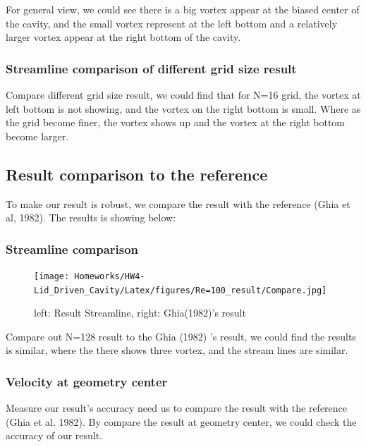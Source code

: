 \documentclass[12pt]{article}
\begin{document}
For general view, we could see there is a big vortex appear at the biased center of the cavity, 
and the small vortex represent at 
the left bottom and a relatively larger vortex appear at the  right bottom of the cavity.\\


\subsubsection{Streamline comparison of different grid size result}
Compare different grid size result, 
we could find that for N=16 grid, 
the vortex at left bottom is not showing,
 and the vortex on the right bottom is small. 
 Where as the grid become finer, 
 the vortex shows up and the vortex at 
 the right bottom become larger.







\subsection{Result comparison to the reference}

To make our result is robust, we compare the result with the reference (Ghia et al, 1982)\cite{GHIA1982387}. The results is showing below:

\subsubsection{Streamline comparison}
\begin{figure}[H]
    \centering
    \texttt{[image: Homeworks/HW4-Lid\_Driven\_Cavity/Latex/figures/Re=100\_result/Compare.jpg]}
    \caption{left: Result Streamline, right: Ghia(1982)\cite{GHIA1982387}'s result}
\end{figure}

Compare out N=128 result to the Ghia (1982)\cite{GHIA1982387} 's result, we could find the results is similar, where the there shows three vortex, and the stream lines are similar.

\subsubsection{Velocity at geometry center}


Measure our result's accuracy need us to compare the result with the reference (Ghia et al. 1982)\cite{GHIA1982387}. By compare the result at geometry center, we could check the accuracy of our result. 
\end{document}
